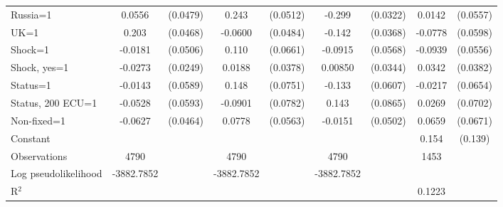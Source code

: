 \begin{tabular}{l|cccccc|cc}
Russia=1        &   0.0556         & (0.0479)&    0.243\sym{***}& (0.0512)&   -0.299\sym{***}& (0.0322)&   0.0142         & (0.0557)\\
UK=1            &    0.203\sym{***}& (0.0468)&  -0.0600         & (0.0484)&   -0.142\sym{***}& (0.0368)&  -0.0778         & (0.0598)\\
Shock=1         &  -0.0181         & (0.0506)&    0.110\sym{*}  & (0.0661)&  -0.0915         & (0.0568)&  -0.0939\sym{*}  & (0.0556)\\
Shock, yes=1    &  -0.0273         & (0.0249)&   0.0188         & (0.0378)&  0.00850         & (0.0344)&   0.0342         & (0.0382)\\
Status=1        &  -0.0143         & (0.0589)&    0.148\sym{**} & (0.0751)&   -0.133\sym{**} & (0.0607)&  -0.0217         & (0.0654)\\
Status, 200 ECU=1&  -0.0528         & (0.0593)&  -0.0901         & (0.0782)&    0.143\sym{*}  & (0.0865)&   0.0269         & (0.0702)\\
Non-fixed=1     &  -0.0627         & (0.0464)&   0.0778         & (0.0563)&  -0.0151         & (0.0502)&   0.0659         & (0.0671)\\
Constant        &                  &         &                  &         &                  &         &    0.154         &  (0.139)\\
\hline
Observations    &     4790         &         &     4790         &         &     4790         &         &     1453         &         \\
Log pseudolikelihood  & -3882.7852   &         &      -3882.7852             &         &       -3882.7852            &         &           &   \\ 
R$^2$      &                  &         &                  &         &                  &         &     0.1223      &   \\ 


\end{tabular}
